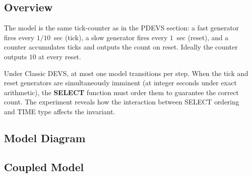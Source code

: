 \subsection*{Overview}

The model is the same tick-counter as in the PDEVS section: a fast
generator fires every $1/10$~sec (tick), a slow generator fires every
$1$~sec (reset), and a counter accumulates ticks and outputs the count
on reset.  Ideally the counter outputs $10$ at every reset.

Under Classic DEVS, at most one model transitions per step.  When the
tick and reset generators are simultaneously imminent (at integer
seconds under exact arithmetic), the \textbf{SELECT} function must
order them to guarantee the correct count.  The experiment reveals how
the interaction between SELECT ordering and TIME type affects the
invariant.

\subsection*{Model Diagram}

\begin{center}
\end{center}

\subsection*{Coupled Model}

